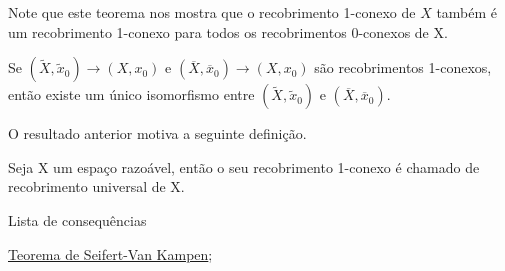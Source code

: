 Note que este teorema nos mostra que o recobrimento 1-conexo de $X$ também é um recobrimento 1-conexo para todos os recobrimentos 0-conexos de X.

\begin{corol}
    Se $(\tilde X, \tilde x_0) \longrightarrow (X, x_0)$ e $(\overline{X}, \overline{x}_0) \longrightarrow (X, x_0)$ são recobrimentos 1-conexos, então existe um único isomorfismo entre $(\tilde X, \tilde x_0)$ e $(\overline{X}, \overline{x}_0)$.
\end{corol}

O resultado anterior motiva a seguinte definição.

\begin{defi}
    Seja X um espaço razoável, então o seu recobrimento 1-conexo é chamado de recobrimento universal de X.
\end{defi}

\begin{titlemize}{Lista de consequências}
	\item \hyperref[teorema-de-seifert-van-kampen]{Teorema de Seifert-Van Kampen};
\end{titlemize}
